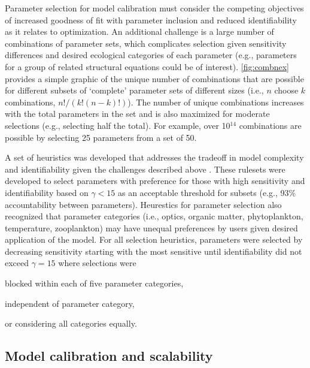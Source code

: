 \documentclass[review]{elsarticle}\usepackage[]{graphicx}\usepackage[]{color}
\begin{document}
Parameter selection for model calibration must consider the competing objectives of increased goodness of fit with parameter inclusion and reduced identifiability as it relates to optimization.  An additional challenge is a large number of combinations of parameter sets, which complicates selection given sensitivity differences and desired ecological categories of each parameter (e.g., parameters for a group of related structural equations could be of interest).  \cref{fig:combnex} provides a simple graphic of the unique number of combinations that are possible for different subsets of `complete' parameter sets of different sizes (i.e., $n$ choose $k$ combinations, $n!/\left(k!\left(n-k\right)!\right)$).  The number of unique combinations increases with the total parameters in the set and is also maximized for moderate selections (e.g., selecting half the total).  For example, over 10$^{14}$ combinations are possible by selecting 25 parameters from a set of 50.

A set of heuristics was developed that addresses the tradeoff in model complexity and identifiability given the challenges described above \citep[see also][]{Wagener01}.  These rulesets were developed to select parameters with preference for those with high sensitivity and identifiability based on $\gamma < 15$ as an acceptable threshold for subsets (e.g., 93\% accountability between parameters).  Heurestics for parameter selection also recognized that parameter categories (i.e., optics, organic matter, phytoplankton, temperature, zooplankton) may have unequal preferences by users given desired application of the model.  For all selection heuristics, parameters were selected by decreasing sensitivity starting with the most sensitive until identifiability did not exceed $\gamma = 15$ where selections were \begin{inparaenum}[1\upshape)]
\item blocked within each of five parameter categories,
\item independent of parameter category,
\item or considering all categories equally.
\end{inparaenum}

\subsection{Model calibration and scalability}
\end{document}
